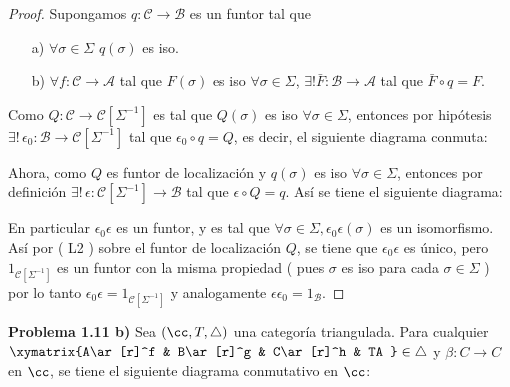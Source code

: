 \begin{proof}
Supongamos $q:\mathscr{C}\to \mathscr{B}$ es un funtor tal que 
\begin{itemize}
\item[a)] $\forall \sigma\in \Sigma$ \quad $q(\sigma)$ es iso.
\item[b)] $\forall f:\mathscr{C}\to \mathscr{A}$ tal que $F(\sigma)$ es iso $\forall \sigma\in \Sigma$, $\exists ! \bar{F}:\mathscr{B}\to\mathscr{A}$
tal que $\bar{F}\circ q=F$.\\
\end{itemize}

Como $Q:\mathscr{C}\to\mathscr{C}[\Sigma^{-1}]$ es tal que $Q(\sigma)$ es iso $\forall \sigma \in \Sigma$, entonces por 
hipótesis $\exists !\,\epsilon_0:\mathscr{B}\to \mathscr{C}[\Sigma^{-1}]$ tal que $\epsilon_0\circ q=Q$, es decir, el siguiente diagrama conmuta:\\
\centerline{
}
Ahora, como $Q$ es funtor de localización y $q(\sigma)$ es iso $\forall \sigma\in \Sigma$, entonces por definición 
$\exists !\,\epsilon:\mathscr{C}[\Sigma^{-1}]\to \mathscr{B}$ tal que $\epsilon\circ Q=q$. Así se tiene el siguiente diagrama:\\
\centerline{
}

En particular $\epsilon_0\epsilon$ es un funtor, y es tal que $\forall \sigma\in \Sigma,$\quad $\epsilon_0\epsilon(\sigma)$ es un isomorfismo. Así por ( L2 )
sobre el funtor de localización $Q$, se tiene que $\epsilon_0\epsilon$ es único, pero $1_{\mathscr{C}[\Sigma^{-1}]}$ es un funtor con la misma
propiedad ( pues $\sigma$ es iso para cada $\sigma \in \Sigma$  ) por lo tanto $\epsilon_0\epsilon=1_{\mathscr{C}[\Sigma^{-1}]}$ y analogamente
$\epsilon\epsilon_0=1_{\mathscr{B}}$.
\end{proof}









\textbf{Problema 1.11 b)} Sea $(\cc,T,\triangle)$ una categor\'ia triangulada. Para cualquier 
$\xymatrix{A\ar[r]^f & B\ar[r]^g & C\ar[r]^h & TA }\in \triangle$ y $\beta:C\to C$ en $\cc$, se tiene el siguiente diagrama conmutativo en $\cc$:














